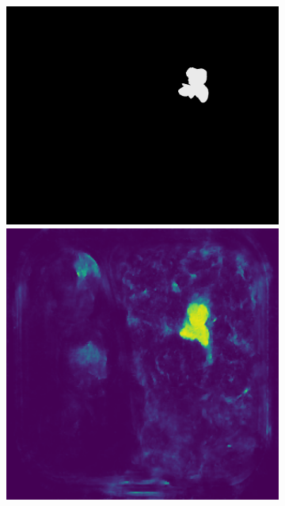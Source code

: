 \begin{figure}[H]
\begin{subfigure}[b]{\textwidth}
\begin{minipage}{0.45\textwidth}
            \includegraphics[width=\textwidth]{figures/appendix/appendix_DRAEM/BB/226_m.png}
            \includegraphics[width=\textwidth]{figures/appendix/appendix_DRAEM/BB/226_mask.png}
        \end{minipage}
    \end{subfigure}
    

\end{figure}

